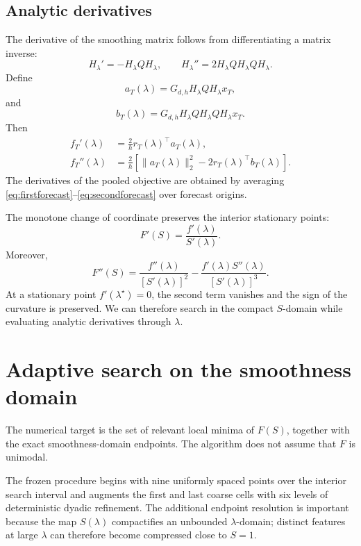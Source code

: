 \documentclass[english]{smcca}
\begin{document}
\subsection{Analytic derivatives}

The derivative of the smoothing matrix follows from differentiating a matrix inverse:
\[
H_\lambda'
=
-H_\lambda QH_\lambda,
\qquad
H_\lambda''
=
2H_\lambda QH_\lambda QH_\lambda.
\]
Define
\[
a_T(\lambda)
=
G_{d,h}H_\lambda QH_\lambda x_T,
\]
and
\[
b_T(\lambda)
=
G_{d,h}H_\lambda QH_\lambda QH_\lambda x_T.
\]
Then
\begin{align}
f_T'(\lambda)
&=
\frac{2}{h}r_T(\lambda)^\top a_T(\lambda),
\label{eq:firstforecast}
\\
f_T''(\lambda)
&=
\frac{2}{h}
\left[
\|a_T(\lambda)\|_2^2
-
2r_T(\lambda)^\top b_T(\lambda)
\right].
\label{eq:secondforecast}
\end{align}
The derivatives of the pooled objective are obtained by averaging \eqref{eq:firstforecast}--\eqref{eq:secondforecast} over forecast origins.

The monotone change of coordinate preserves the interior stationary points:
\begin{equation}
F'(S)
=
\frac{f'(\lambda)}{S'(\lambda)}.
\label{eq:chainfirst}
\end{equation}
Moreover,
\begin{equation}
F''(S)
=
\frac{f''(\lambda)}{[S'(\lambda)]^2}
-
\frac{f'(\lambda)S''(\lambda)}{[S'(\lambda)]^3}.
\label{eq:chainsecond}
\end{equation}
At a stationary point \(f'(\lambda^\star)=0\), the second term vanishes and the sign of the curvature is preserved. We can therefore search in the compact \(S\)-domain while evaluating analytic derivatives through \(\lambda\).

\section{Adaptive search on the smoothness domain}

The numerical target is the set of relevant local minima of \(F(S)\), together with the exact smoothness-domain endpoints. The algorithm does not assume that \(F\) is unimodal.

The frozen procedure begins with nine uniformly spaced points over the interior search interval and augments the first and last coarse cells with six levels of deterministic dyadic refinement. The additional endpoint resolution is important because the map \(S(\lambda)\) compactifies an unbounded \(\lambda\)-domain; distinct features at large \(\lambda\) can therefore become compressed close to \(S=1\).
\end{document}
